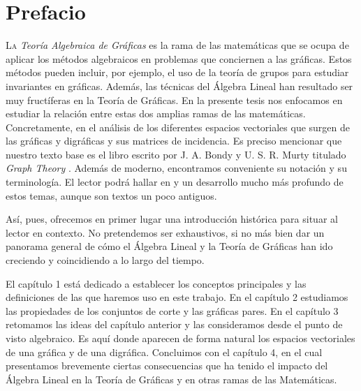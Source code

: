 \chapter*{Prefacio}

\lettrine[lines=9] {\initfamily  \selectfont L}{a} \textit{Teoría Algebraica de Gráficas} es la rama de las matemáticas que se ocupa de aplicar los métodos algebraicos en problemas que conciernen a las gráficas. Estos métodos pueden incluir, por ejemplo, el uso de la teoría de grupos para estudiar invariantes en gráficas. Además, las técnicas del Álgebra Lineal han resultado ser muy fructíferas en la Teoría de Gráficas. En la presente tesis nos enfocamos en estudiar la relación entre estas dos amplias ramas de las matemáticas. Concretamente, en el análisis de los diferentes espacios vectoriales que surgen de las gráficas y digráficas y sus matrices de incidencia. Es preciso mencionar que nuestro texto base es el libro escrito por J. A. Bondy y U. S. R. Murty titulado \textit{Graph Theory} \cite{Bondy}. Además de moderno, encontramos conveniente  su notación y su terminología. El lector podrá hallar en \cite{Deo} y \cite{Seshu} un desarrollo mucho más profundo de estos temas, aunque son textos un poco antiguos.

Así, pues, ofrecemos en primer lugar una introducción histórica para situar al lector en contexto. No pretendemos ser exhaustivos, si no más bien dar un panorama general de cómo el Álgebra Lineal y la Teoría de Gráficas han ido creciendo y coincidiendo a lo largo del tiempo.

El capítulo 1 está dedicado a establecer los conceptos principales y las definiciones de las que haremos uso en este trabajo. En el capítulo 2 estudiamos las propiedades de los conjuntos de corte y las gráficas pares. En el capítulo 3 retomamos las ideas del capítulo anterior y las consideramos desde el punto de visto algebraico. Es aquí donde aparecen de forma natural los espacios vectoriales de una gráfica y de una digráfica. Concluimos con el capítulo 4, en el cual presentamos brevemente ciertas consecuencias que ha tenido el impacto del Álgebra Lineal en la Teoría de Gráficas y en otras ramas de las Matemáticas.
